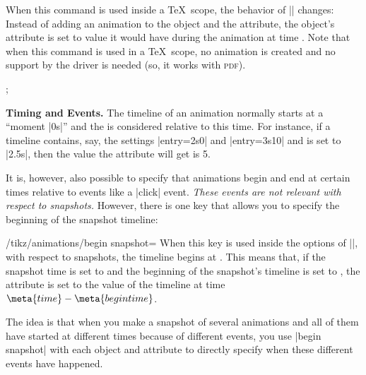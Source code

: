 \begin{command}{\pgfsnapshot{}}
    When this command is used inside a \TeX\ scope, the behavior of
    |\pgfanimateattribute| changes: Instead of adding an animation to the
    object and the attribute, the object's attribute is set to value it would
    have during the animation at time . Note that when this command
    is used in a \TeX\ scope, no animation is created and no support by the
    driver is needed (so, it works with \textsc{pdf}).
\begin{codeexample}[preamble={\usetikzlibrary{animations}}]
\tikz [make snapshot of=1s,
       animate = { myself: = {
         :rotate = { 0s = "0", 2s = "90" },
         :color  = { 0s = "red", 2s = "green" },
         :line width = { 0s = "0mm", 4s = "4mm" }
       }}]
  ;
\end{codeexample}


    \medskip\textbf{Timing and Events.}
    The timeline of an animation normally starts at a ``moment |0s|'' and the
     is considered relative to this time. For instance, if a
    timeline contains, say, the settings |entry={2s}{0}| and |entry={3s}{10}|
    and  is set to |2.5s|, then the value the attribute will get is
    5.

    It is, however, also possible to specify that animations begin and end at
    certain times relative to events like a |click| event. \emph{These events
    are not relevant with respect to snapshots.} However, there is one key that
    allows you to specify the beginning of the snapshot timeline:
    \begin{key}{/tikz/animations/begin snapshot=}
        When this key is used inside the options of |\pgfanimateattribute|,
        with respect to snapshots, the timeline begins at .
        This means that, if the snapshot time is set to  and the
        beginning of the snapshot's timeline is set to , the
        attribute is set to the value of the timeline at time $\meta{time} -
        \meta{begin time}$.

        The idea is that when you make a snapshot of several animations and all
        of them have started at different times because of different events,
        you use |begin snapshot| with each object and attribute to directly
        specify when these different events have happened.
    \end{key}


\end{command}
